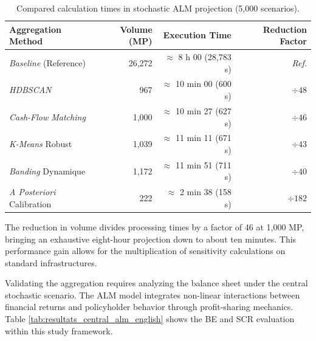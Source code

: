 \begin{table}[H]
    \centering
    \renewcommand{\arraystretch}{1.4}
    \begin{tabular}{|l|r|r|r|}
        \hline
        \textbf{Aggregation Method} & \textbf{Volume (MP)} & \textbf{Execution Time} & \textbf{Reduction Factor} \\
        \hline
        \textit{Baseline} (Reference) & 26,272 & $\approx$ 8 h 00 (28,783 s) & \textit{Ref.} \\
        \textit{HDBSCAN} & 967 & $\approx$ 10 min 00 (600 s) & $\div 48$ \\
        \textit{Cash-Flow Matching} & 1,000 & $\approx$ 10 min 27 (627 s) & $\div 46$ \\
        \textit{K-Means} Robust & 1,039 & $\approx$ 11 min 11 (671 s) & $\div 43$ \\
        \textit{Banding} Dynamique & 1,172 & $\approx$ 11 min 51 (711 s) & $\div 40$ \\
        \textit{A Posteriori} Calibration & 222 & $\approx$ 2 min 38 (158 s) & $\div 182$ \\
        \hline
    \end{tabular}
    \caption{Compared calculation times in stochastic ALM projection (5,000 scenarios).}
    \label{tab:runtimes_synthese_english}
\end{table}

The reduction in volume divides processing times by a factor of 46 at 1,000 MP, bringing an exhaustive eight-hour projection down to about ten minutes. This performance gain allows for the multiplication of sensitivity calculations on standard infrastructures.

Validating the aggregation requires analyzing the balance sheet under the central stochastic scenario. The ALM model integrates non-linear interactions between financial returns and policyholder behavior through profit-sharing mechanics. Table \ref{tab:resultats_central_alm_english} shows the BE and SCR evaluation within this study framework.


